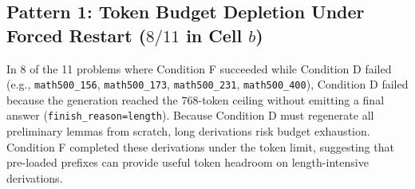 \documentclass[11pt]{article}
\begin{document}
\begin{table}[t]
\centering
\caption{\textbf{Qualitative Failure Mode Classification of Discordant Problems ($N=23$).} Observable generation attributes driving win/loss outcomes between Conditions F and D.}
\label{tab:discordant_mechanisms}
\end{table}

\subsection{Pattern 1: Token Budget Depletion Under Forced Restart ($8/11$ in Cell $b$)}
In 8 of the 11 problems where Condition F succeeded while Condition D failed (e.g., \texttt{math500\_156}, \texttt{math500\_173}, \texttt{math500\_231}, \texttt{math500\_400}), Condition D failed because the generation reached the 768-token ceiling without emitting a final answer (\texttt{finish\_reason=length}). Because Condition D must regenerate all preliminary lemmas from scratch, long derivations risk budget exhaustion. Condition F completed these derivations under the token limit, suggesting that pre-loaded prefixes can provide useful token headroom on length-intensive derivations.
\end{document}
